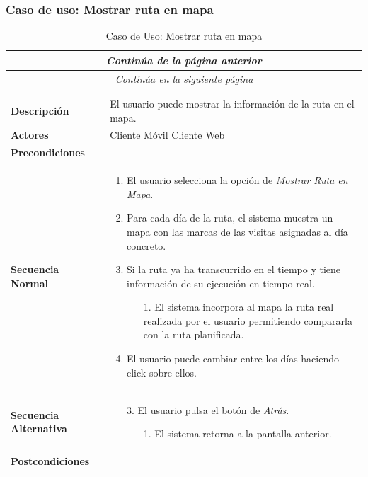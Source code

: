 \subsubsection*{Caso de uso: Mostrar ruta en mapa}
\begin{longtable}{| p{4cm} | p{10cm} |}
\endfirsthead
\multicolumn{2}{c}{\textit{Continúa de la página anterior}}\\[12pt]
\hline
\endhead
\hline
\multicolumn{2}{c}{\textit{Continúa en la siguiente página}} \\
\endfoot
\hline
\caption{Caso de Uso: Mostrar ruta en mapa}\label{fig:1}\\
\endlastfoot


\hline
\multicolumn{2}{|c|}{\textbf{CU$<$09$>$ - Mostrar Ruta en Mapa}} \\

\hline
\textbf{Descripción} &
El usuario puede mostrar la información de la ruta en el mapa.\\

\hline
\textbf{Actores} &
Cliente Móvil\newline
Cliente Web\\

\hline
\textbf{Precondiciones} &
\\

\hline
\textbf{Secuencia Normal} &\mbox{}\par\vspace{-\baselineskip}
\begin{enumerate}[leftmargin=0.7cm, topsep=0.1cm]
\item El usuario selecciona la opción de \textit{Mostrar Ruta en Mapa}.
\item Para cada día de la ruta, el sistema muestra un mapa con las marcas de las visitas asignadas al día concreto.
\item Si la ruta ya ha transcurrido en el tiempo y tiene información de su ejecución en tiempo real.
	\begin{itemize}
	\item[1.] El sistema incorpora al mapa la ruta real realizada por el usuario permitiendo compararla con la ruta planificada.
	\end{itemize}
\item El usuario puede cambiar entre los días haciendo click sobre ellos.
\end{enumerate}\\

\hline
\textbf{Secuencia Alternativa} &\mbox{}\par\vspace{-\baselineskip}
\begin{enumerate}[leftmargin=0.9cm, topsep=0.1cm]
\item[3.] El usuario pulsa el botón de \textit{Atrás}.
	\begin{itemize}
	\item[1.] El sistema retorna a la pantalla anterior.
	\end{itemize}
\end{enumerate}
\\

\hline
\textbf{Postcondiciones} & \\
\hline
\end{longtable}
